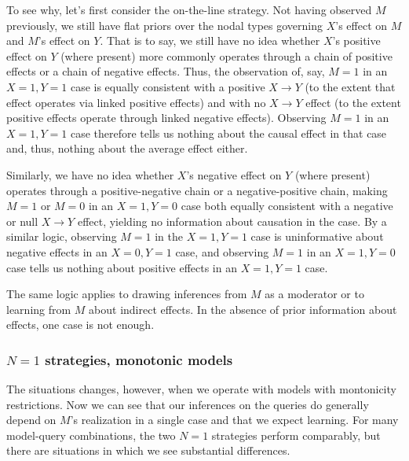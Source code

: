 \documentclass[
  12pt,
]{book}
\begin{document}
To see why, let's first consider the on-the-line strategy. Not having observed \(M\) previously, we still have flat priors over the nodal types governing \(X\)'s effect on \(M\) and \(M\)'s effect on \(Y\). That is to say, we still have no idea whether \(X\)'s positive effect on \(Y\) (where present) more commonly operates through a chain of positive effects or a chain of negative effects. Thus, the observation of, say, \(M=1\) in an \(X=1, Y=1\) case is equally consistent with a positive \(X \rightarrow Y\) (to the extent that effect operates via linked positive effects) and with no \(X \rightarrow Y\) effect (to the extent positive effects operate through linked negative effects). Observing \(M=1\) in an \(X=1, Y=1\) case therefore tells us nothing about the causal effect in that case and, thus, nothing about the average effect either.

Similarly, we have no idea whether \(X\)'s negative effect on \(Y\) (where present) operates through a positive-negative chain or a negative-positive chain, making \(M=1\) or \(M=0\) in an \(X=1, Y=0\) case both equally consistent with a negative or null \(X \rightarrow Y\) effect, yielding no information about causation in the case. By a similar logic, observing \(M=1\) in the \(X=1, Y=1\) case is uninformative about negative effects in an \(X=0, Y=1\) case, and observing \(M=1\) in an \(X=1, Y=0\) case tells us nothing about positive effects in an \(X=1, Y=1\) case.

The same logic applies to drawing inferences from \(M\) as a moderator or to learning from \(M\) about indirect effects. In the absence of prior information about effects, one case is not enough.

\hypertarget{n1-strategies-monotonic-models}{%
\subsubsection{\texorpdfstring{\(N=1\) strategies, monotonic models}{N=1 strategies, monotonic models}}\label{n1-strategies-monotonic-models}}

The situations changes, however, when we operate with models with montonicity restrictions. Now we can see that our inferences on the queries do generally depend on \(M\)'s realization in a single case and that we expect learning. For many model-query combinations, the two \(N=1\) strategies perform comparably, but there are situations in which we see substantial differences.
\end{document}
